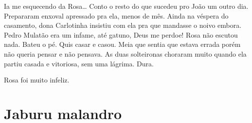 \begin{linenumbers}
Ia me esquecendo da Rosa\ldots{} Conto o resto do que sucedeu pro João um
outro dia. Prepararam enxoval apressado pra ela, menos de mês. Ainda na
véspera do casamento, dona Carlotinha insistiu com ela pra que mandasse
o noivo embora. Pedro Mulatão era um infame, até gatuno, Deus me perdoe!
Rosa não escutou nada. Bateu o pé. Quis casar e casou. Meia que sentia
que estava errada porém não queria pensar e não pensava. As duas
solteironas choraram muito quando ela partiu casada e vitoriosa, sem uma
lágrima. Dura.

Rosa foi muito infeliz.
\end{linenumbers}

\chapter{Jaburu malandro}

